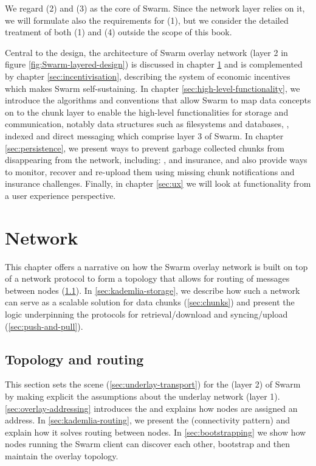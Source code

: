 We regard (2) and (3) as the core of Swarm. Since the network layer relies on it, we will formulate also the requirements for (1), but we consider the detailed treatment of both (1) and (4) outside the scope of this book.


Central to the design, the architecture of Swarm overlay network (layer 2 in figure \ref{fig:Swarm-layered-design}) is discussed in chapter \ref{sec:network} and is complemented by chapter \ref{sec:incentivisation}, describing the system of economic incentives which makes Swarm self-sustaining. In chapter \ref{sec:high-level-functionality}, we introduce the algorithms and conventions that allow Swarm to map data concepts on to the chunk layer to enable the high-level functionalities for storage and communication, notably data structures such as filesystems and databases, , indexed  and direct messaging  which comprise layer 3 of Swarm.
In chapter \ref{sec:persistence}, we present ways to prevent garbage collected chunks from disappearing from the network, including: ,  and insurance, and also provide ways to monitor, recover and re-upload them using missing chunk notifications and insurance challenges. 
Finally, in chapter \ref{sec:ux} we will look at functionality from a user experience perspective.

\chapter{Network}\label{sec:network}

This chapter offers a narrative on how the Swarm overlay network is built on top of a  network protocol to form a topology that allows for routing of messages between nodes (\ref{sec:topology-routing}). In \ref{sec:kademlia-storage}, we describe how such a network can serve as a scalable  solution for data chunks (\ref{sec:chunks}) and present the logic underpinning the protocols for retrieval/download and syncing/upload (\ref{sec:push-and-pull}).

\section{Topology and routing \statusgreen}\label{sec:topology-routing}

This section sets the scene (\ref{sec:underlay-transport}) for the  (layer 2) of Swarm by making explicit the assumptions about the underlay network (layer 1). \ref{sec:overlay-addressing} introduces the  and explains how nodes are assigned an address. In  \ref{sec:kademlia-routing}, we present the   (connectivity pattern) and explain how it solves routing between nodes. In \ref{sec:bootstrapping} we show how nodes running the Swarm client can discover each other, bootstrap and then maintain the overlay topology.

